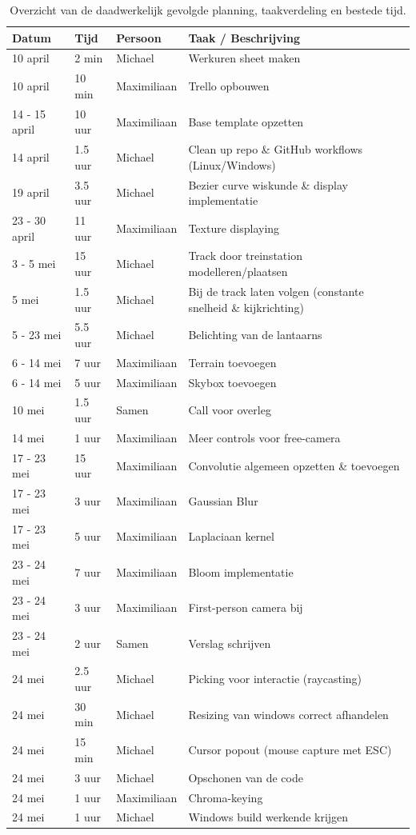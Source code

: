 \documentclass[11pt,a4paper]{article}
\begin{document}
\begin{table}[h!]
\centering
\small %
\begin{tabularx}{\textwidth}{@{} l l l X @{}}
\toprule
\textbf{Datum} & \textbf{Tijd} & \textbf{Persoon} & \textbf{Taak / Beschrijving} \\
\midrule
10 april & 2 min & Michael & Werkuren sheet maken \\
10 april & 10 min & Maximiliaan & Trello opbouwen \\
14 - 15 april & 10 uur & Maximiliaan & Base template opzetten \\
14 april & 1.5 uur & Michael & Clean up repo \& GitHub workflows (Linux/Windows) \\
19 april & 3.5 uur & Michael & Bezier curve wiskunde \& display implementatie \\
23 - 30 april & 11 uur & Maximiliaan & Texture displaying \\
3 - 5 mei & 15 uur & Michael & Track door treinstation modelleren/plaatsen \\
5 mei & 1.5 uur & Michael & Bij de track laten volgen (constante snelheid \& kijkrichting) \\
5 - 23 mei & 5.5 uur & Michael & Belichting van de lantaarns \\
6 - 14 mei & 7 uur & Maximiliaan & Terrain toevoegen \\
6 - 14 mei & 5 uur & Maximiliaan & Skybox toevoegen \\
10 mei & 1.5 uur & Samen & Call voor overleg \\
14 mei & 1 uur & Maximiliaan & Meer controls voor free-camera \\
17 - 23 mei & 15 uur & Maximiliaan & Convolutie algemeen opzetten \& toevoegen \\
17 - 23 mei & 3 uur & Maximiliaan & Gaussian Blur \\
17 - 23 mei & 5 uur & Maximiliaan & Laplaciaan kernel \\
23 - 24 mei & 7 uur & Maximiliaan & Bloom implementatie \\
23 - 24 mei & 3 uur & Maximiliaan & First-person camera bij \\
23 - 24 mei & 2 uur & Samen & Verslag schrijven \\
24 mei & 2.5 uur & Michael & Picking voor interactie (raycasting) \\
24 mei & 30 min & Michael & Resizing van windows correct afhandelen \\
24 mei & 15 min & Michael & Cursor popout (mouse capture met ESC) \\
24 mei & 3 uur & Michael & Opschonen van de code \\
24 mei & 1 uur & Maximiliaan & Chroma-keying \\
24 mei & 1 uur & Michael & Windows build werkende krijgen \\
\bottomrule
\end{tabularx}
\caption{Overzicht van de daadwerkelijk gevolgde planning, taakverdeling en bestede tijd.}
\end{table}
\end{document}
